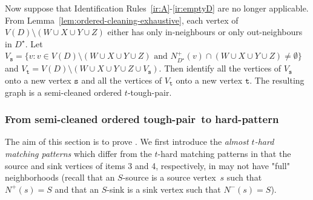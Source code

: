 \documentclass[a4paper,11pt]{article}
\theoremstyle{plain}
\newtheorem{identification rule}{Identification Rule}
\theoremstyle{definition}
\theoremstyle{remark}
\newcommand{\toughpair}{tough-pair}
\newcommand{\sss}{\texttt{s}}
\newcommand{\ttt}{\texttt{t}}
\begin{document}
Now suppose that Identification Rules~\ref{ir:A}-\ref{ir:emptyD} are no longer applicable. From Lemma~\ref{lem:ordered-cleaning-exhaustive}, each vertex of $V(D) \setminus (W \cup X \cup Y \cup Z)$ either has only in-neighbours or only out-neighbours in $D^{\star}$.
Let $V_{\sss} =\{v : v \in V(D) \setminus (W \cup X \cup Y \cup Z) \text{ and } N_{D^{\star}}^+(v) \cap (W \cup X \cup Y \cup Z) \neq \emptyset \}$ and
$V_{\ttt} = V(D) \setminus (W \cup X \cup Y \cup Z \cup V_{\sss})$. Then identify all the vertices of $V_{\sss}$ onto a new vertex $\sss$ and all the vertices of $V_{\ttt}$ onto a new vertex $\ttt$. The resulting graph is a semi-cleaned ordered $t$-\toughpair.

\subsubsection{From semi-cleaned ordered \toughpair\ to hard-pattern}
\label{sec:semicleantoclean}

The aim of this section is to prove . We first introduce the \emph{almost $t$-hard matching patterns} which differ from the $t$-hard matching patterns in that the source and sink vertices of items 3 and 4, respectively, in  may not have "full" neighborhoods (recall that an $S$-source is a source vertex~$s$ such that $N^+(s) = S$ and that an $S$-sink is a sink vertex such that $N^-(s) = S$).
\end{document}
